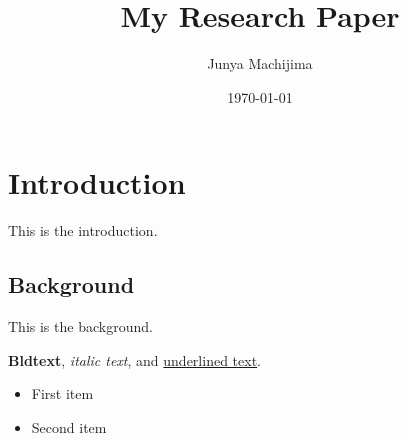 \documentclass{article}
\begin{document}
\title{My Research Paper}
\author{Junya Machijima}
\date{\today}
\maketitle

\section{Introduction}
This is the introduction.

\subsection{Background}
This is the background.

\textbf{Bldtext}, \textit{italic text}, and \underline{underlined text}.

\begin{itemize}
    \item First item
    \item Second item
\end{itemize}
\end{document}
